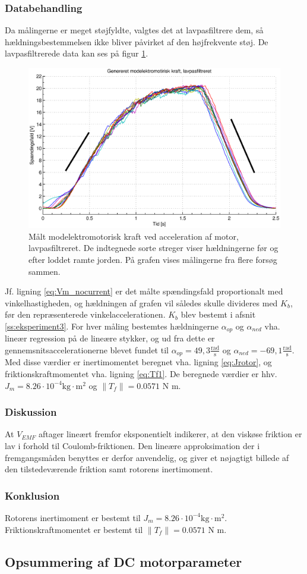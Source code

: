 \subsubsection{Databehandling}
Da målingerne er meget støjfyldte, valgtes det at lavpasfiltrere dem, så hældningsbestemmelsen
ikke bliver påvirket af den højfrekvente støj.
De lavpasfiltrerede data kan ses på figur \ref{fig:vemf1}.
\begin{figure}[th!]
	\centering
	\includegraphics[width=1\textwidth]{./graphics/vemf1.eps}
	\caption[Målt modelektromotorisk kraft ved acceleration af motor, lavpasfiltreret]
		{Målt modelektromotorisk kraft ved acceleration af motor, lavpasfiltreret.
		De indtegnede sorte streger viser hældningerne før og efter loddet ramte jorden.
		På grafen vises målingerne fra flere forsøg sammen.}
	\label{fig:vemf1}
\end{figure}
Jf. ligning \ref{eq:Vm_nocurrent} er det målte spændingsfald proportionalt med
vinkelhastigheden, og hældningen af grafen vil således skulle divideres med $K_b$,
før den repræsenterede vinkelaccelerationen. $K_b$ blev bestemt i afsnit \ref{ss:eksperiment3}.
For hver måling bestemtes hældningerne $\alpha_{op}$ og $\alpha_{ned}$ vha. lineær regression på de lineære stykker,
og ud fra dette er gennemsnitsaccelerationerne blevet fundet til
$\alpha_{op}=49,3 \frac{\text{rad}}{\text{s}}$ og $\alpha_{ned}=-69,1 \frac{\text{rad}}{\text{s}}$.
Med disse værdier er inertimomentet beregnet vha. ligning \ref{eq:Jrotor}, og friktionskraftmomentet vha. ligning \ref{eq:Tf1}.
De beregnede værdier er hhv. $J_m=8.26\cdot10^{-4} \text{kg}\cdot{\text{m}^2}$ og $\|T_f\|=0.0571$ N m.
\subsubsection{Diskussion}
At $V_{EMF}$ aftager lineært fremfor eksponentielt indikerer,
at den viskøse friktion er lav i forhold til Coulomb-friktionen.
Den lineære approksimation der i fremgangsmåden benyttes er derfor anvendelig,
og giver et nøjagtigt billede af den tilstedeværende friktion samt rotorens inertimoment.
\subsubsection{Konklusion}
Rotorens inertimoment er bestemt til $J_m=8.26\cdot10^{-4} \text{kg}\cdot{\text{m}^2}$.
Friktionskraftmomentet er bestemt til $\|T_f\|=0.0571$ N m.
\subsection{Opsummering af DC motorparameter}